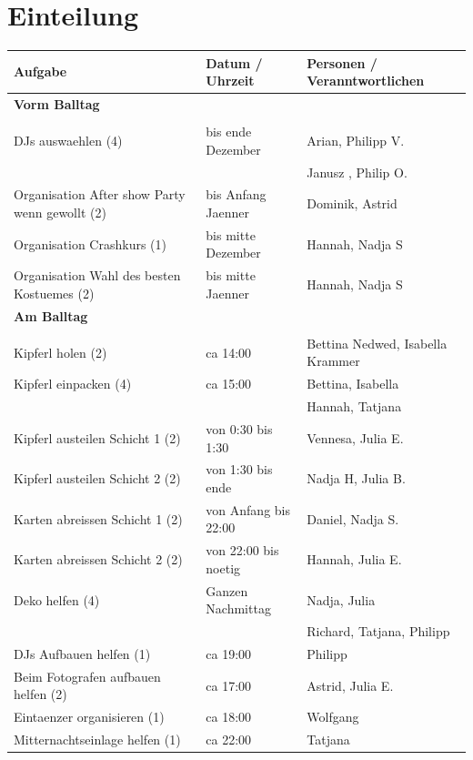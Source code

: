 \documentclass[12pt]{article}
\begin{document}
\section{Einteilung}
  \begin{tabular}{ | p{} | p{} |  p{} |}
    \hline
\textbf{Aufgabe} & \textbf{Datum / Uhrzeit} & \textbf{Personen / Veranntwortlichen} \\ 
    \hline 
    \hline
\textbf{Vorm Balltag} &  &  \\ 
  &  &  \\ \hline
DJs auswaehlen (4) & bis ende Dezember & Arian, Philipp V. \\ 
  &  &  Janusz , Philip O.\\ \hline
Organisation After show Party wenn gewollt (2) & bis Anfang Jaenner & Dominik, Astrid  \\ \hline
Organisation Crashkurs (1) & bis mitte Dezember &  Hannah, Nadja S\\ \hline
Organisation Wahl des besten Kostuemes (2) & bis mitte Jaenner &  Hannah, Nadja S \\ \hline
\textbf{Am Balltag} &  &  \\ 
  &  &  \\ \hline
Kipferl holen (2) & ca 14:00 & Bettina Nedwed, Isabella Krammer \\ \hline
Kipferl einpacken (4) & ca 15:00 & Bettina, Isabella \\ 
  &  & Hannah, Tatjana  \\ \hline
Kipferl austeilen Schicht 1 (2) & von 0:30 bis 1:30 & Vennesa, Julia E.  \\ \hline
Kipferl austeilen Schicht 2 (2) & von 1:30 bis ende & Nadja H, Julia B.  \\ \hline
Karten abreissen Schicht 1 (2) & von Anfang bis 22:00 & Daniel, Nadja S. \\ \hline
Karten abreissen Schicht 2 (2) & von 22:00 bis noetig &  Hannah, Julia E. \\ \hline
Deko helfen (4) & Ganzen Nachmittag & Nadja, Julia \\
  &  & Richard, Tatjana, Philipp \\ \hline
DJs Aufbauen helfen (1) & ca 19:00 & Philipp \\ \hline
Beim Fotografen aufbauen helfen (2) & ca 17:00 & Astrid, Julia E. \\ \hline
Eintaenzer organisieren (1) &  ca 18:00 & Wolfgang \\ \hline
Mitternachtseinlage helfen (1) & ca 22:00 & Tatjana \\ \hline

\end{tabular}
\end{document}
